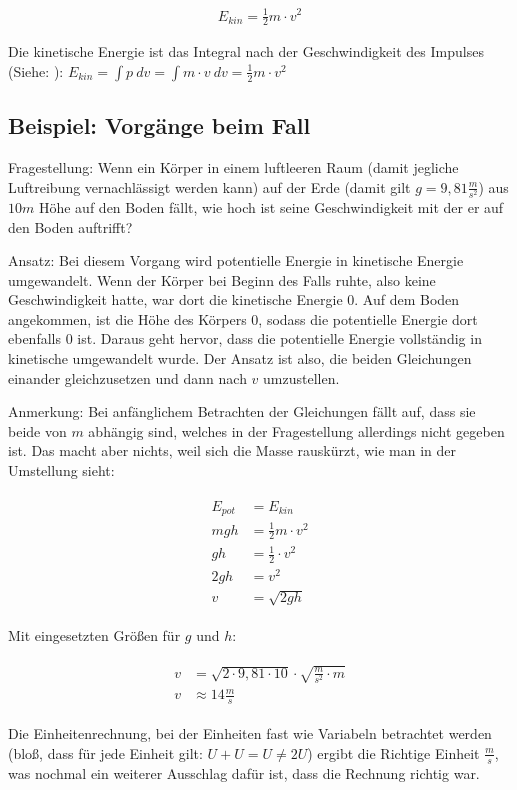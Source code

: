 \begin{align} \label{eq:ekin}
	E_{kin} = \frac{1}{2} m \cdot v^2
\end{align}

\begin{NiceToKnow}
	Die kinetische Energie ist das Integral nach der Geschwindigkeit des Impulses (Siehe: ): $E_{kin} = \int p \ dv = \int m \cdot v \ dv = \frac{1}{2} m \cdot v^2$
\end{NiceToKnow}

\subsection{Beispiel: Vorgänge beim Fall}

Fragestellung: Wenn ein Körper in einem luftleeren Raum (damit jegliche Luftreibung vernachlässigt werden kann) auf der Erde (damit gilt $g=9,81\frac{m}{s^2}$) aus $10m$ Höhe auf den Boden fällt, wie hoch ist seine Geschwindigkeit mit der er auf den Boden auftrifft?

Ansatz: Bei diesem Vorgang wird potentielle Energie in kinetische Energie umgewandelt. Wenn der Körper bei Beginn des Falls ruhte, also keine Geschwindigkeit hatte, war dort die kinetische Energie $0$. Auf dem Boden angekommen, ist die Höhe des Körpers $0$, sodass die potentielle Energie dort ebenfalls $0$ ist. Daraus geht hervor, dass die potentielle Energie vollständig in kinetische umgewandelt wurde. Der Ansatz ist also, die beiden Gleichungen einander gleichzusetzen und dann nach $v$ umzustellen.

Anmerkung: Bei anfänglichem Betrachten der Gleichungen fällt auf, dass sie beide von $m$ abhängig sind, welches in der Fragestellung allerdings nicht gegeben ist. Das macht aber nichts, weil sich die Masse \glqq rauskürzt\grqq , wie man in der Umstellung sieht:

\begin{align}
\begin{split}
	E_{pot} &= E_{kin} \\
	mgh &= \frac{1}{2}m \cdot v^2 \\
	gh &= \frac{1}{2} \cdot v^2 \\
	2gh &= v^2 \\
	v &= \sqrt{2gh}
\end{split}
\end{align}

\noindent Mit eingesetzten Größen für $g$ und $h$:

\begin{align}
\begin{split}
	v &= \sqrt{2 \cdot 9,81 \cdot 10} \cdot \sqrt{\frac{m}{s^2} \cdot m} \\
	v &\approx 14 \frac{m}{s}
\end{split}
\end{align}

Die Einheitenrechnung, bei der Einheiten fast wie Variabeln betrachtet werden (bloß, dass für jede Einheit gilt: $U+U=U \neq 2U$) ergibt die Richtige Einheit $\frac{m}{s}$, was nochmal ein weiterer Ausschlag dafür ist, dass die Rechnung richtig war.





